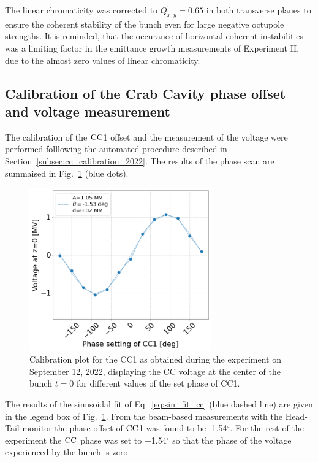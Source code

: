 The linear chromaticity was corrected to $Q^\prime_{x,y}=0.65$ in both transverse planes to ensure the coherent stability of the bunch even for large negative octupole strengths. It is reminded, that the occurance of horizontal coherent instabilities was a limiting factor in the emittance growth measurements of Experiment II, due to the almost zero values of linear chromaticity.


\subsection{Calibration of the Crab Cavity phase offset and voltage measurement}\label{subsec:cc_calibration_2022_exp3}
The calibration of the ${\mathrm{CC}}$1 offset and the measurement of the voltage were performed folllowing the automated procedure described in Section~\ref{subsec:cc_calibration_2022}. The results of the phase scan are summaised in Fig.~\ref{fig:Vcc_calibration_md_sep2022} (blue dots).

\begin{figure}[!h] %
   \centering         
   \includegraphics[width=0.7\textwidth]{images/Ch8/Vcc_at_z_zero_vs_inspector_phase_CC1_for_thesis_new_xlabel_sep22.png}
       \caption{Calibration plot for the CC1 as obtained during the experiment on September 12, 2022, displaying the CC voltage at the center of the bunch $t=0$ for different values of the set phase of CC1.}
       \label{fig:Vcc_calibration_md_sep2022}
\end{figure}

The results of the sinusoidal fit of Eq.~\eqref{eq:sin_fit_cc} (blue dashed line) are given in the legend box of Fig.~\ref{fig:Vcc_calibration_md_sep2022}. From the beam-based measurements with the Head-Tail monitor the phase offset of ${\mathrm{CC}}$1 was found to be -1.54$^\circ$. For the rest of the experiment the ${\mathrm{CC}}$ phase was set to +1.54$^\circ$ so that the phase of the voltage experienced by the bunch is zero. 

